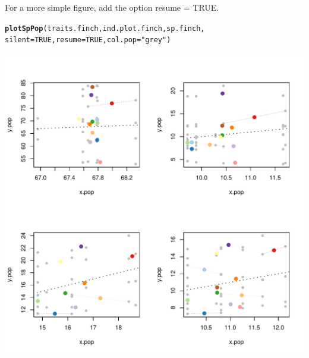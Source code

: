 \documentclass[12pt]{article}\usepackage[]{graphicx}\usepackage[]{color}
\makeatletter
\def\maxwidth{ %
  \ifdim\Gin@nat@width>\linewidth
    \linewidth
  \else
    \Gin@nat@width
  \fi
}
\newcommand{\hlnum}[1]{\textcolor[rgb]{0.686,0.059,0.569}{#1}}%
\newcommand{\hlstr}[1]{\textcolor[rgb]{0.192,0.494,0.8}{#1}}%
\newcommand{\hlstd}[1]{\textcolor[rgb]{0.345,0.345,0.345}{#1}}%
\newcommand{\hlkwc}[1]{\textcolor[rgb]{0.333,0.667,0.333}{#1}}%
\newcommand{\hlkwd}[1]{\textcolor[rgb]{0.737,0.353,0.396}{\textbf{#1}}}%
\newenvironment{kframe}{%
 \def\at@end@of@kframe{}%
 \ifinner\ifhmode%
  \def\at@end@of@kframe{\end{minipage}}%
  \begin{minipage}{\columnwidth}%
 \fi\fi%
 \def\FrameCommand##1{\hskip\@totalleftmargin \hskip-\fboxsep
 \colorbox{shadecolor}{##1}\hskip-\fboxsep
     \hskip-\linewidth \hskip-\@totalleftmargin \hskip\columnwidth}%
 \MakeFramed {\advance\hsize-\width
   \@totalleftmargin\z@ \linewidth\hsize
   \@setminipage}}%
 {\par\unskip\endMakeFramed%
 \at@end@of@kframe}
\newenvironment{knitrout}{}{} %
\makeatother
\begin{document}
For a more simple figure, add the option resume = TRUE. 
\begin{knitrout}
\color{fgcolor}\begin{kframe}
\begin{alltt}
\hlkwd{plotSpPop}\hlstd{(traits.finch, ind.plot.finch, sp.finch,}
      \hlkwc{silent} \hlstd{=} \hlnum{TRUE}\hlstd{,} \hlkwc{resume} \hlstd{=} \hlnum{TRUE}\hlstd{,} \hlkwc{col.pop} \hlstd{=} \hlstr{"grey"}\hlstd{)}
\end{alltt}
\end{kframe}
\includegraphics[width=\maxwidth]{figure/unnamed-chunk-29} 

\end{knitrout}
\end{document}
